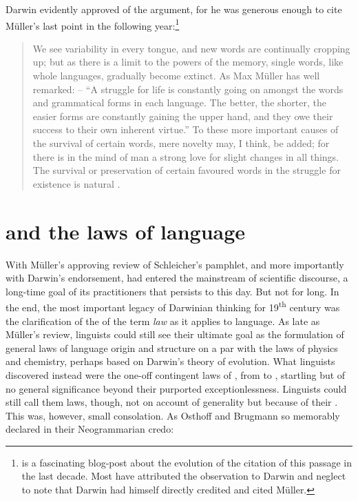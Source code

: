 \documentclass[output=paper,
modfonts
]{LSP/langsci}
\begin{document}
Darwin evidently approved of the argument, for he was generous enough to cite Müller's last point in  the following year:\footnote{\citet{Dingemanse2013} is a fascinating blog-post about the evolution of the citation of this passage in the last decade.  Most have attributed the observation to Darwin and neglect to note that Darwin had himself directly credited and cited Müller.}

\begin{quote}
We see variability in every tongue, and new words are continually cropping up; but as there is a limit to the powers of the memory, single words, like whole languages, gradually become extinct. As Max Müller has well remarked: -- ``A struggle for life is constantly going on amongst the words and grammatical forms in each language. The better, the shorter, the easier forms are constantly gaining the upper hand, and they owe their success to their own inherent virtue.''{ }To these more important causes of the survival of certain words, mere novelty may, I think, be added; for there is in the mind of man a strong love for slight changes in all things. The survival or preservation of certain favoured words in the struggle for existence is natural . \citep[60--61]{Darwin1871}
\end{quote}

\section{ and the laws of language}

With Müller's approving review of Schleicher's pamphlet, and more importantly with Darwin's endorsement,  had entered the mainstream of scientific discourse, a long-time goal of its practitioners that persists to this day. But not for long.  In the end, the most important legacy of Darwinian thinking for 19\textsuperscript{th} century  was the clarification of the  of the term \textit{law} as it applies to language.  As late as Müller's review, linguists could still see their ultimate goal as the formulation of general laws of language origin and structure on a par with the laws of physics and chemistry, perhaps based on Darwin's theory of evolution.  What linguists discovered instead were the one-off contingent laws of , from  to , startling but of no general significance beyond their purported exceptionlessness.  Linguists could still call them laws, though, not on account of generality but because of their .  This was, however, small consolation. As Osthoff and Brugmann so memorably declared in their Neogrammarian credo:
\end{document}
